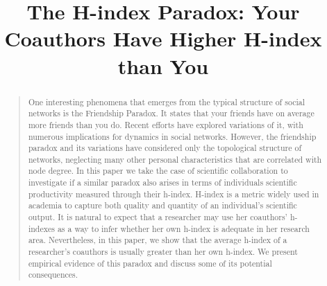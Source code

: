 \documentclass[letterpaper]{article}
\begin{document}
%
\title{The H-index Paradox: Your Coauthors Have Higher H-index than You}



\maketitle
\begin{abstract}
\begin{quote}

One interesting phenomena that emerges from the typical structure of social networks is the Friendship Paradox. It states that your friends have on average more friends than you do. Recent efforts have explored variations of it, with numerous implications for dynamics in social networks.
However, the friendship paradox and its variations have considered only the topological structure of networks, neglecting many other personal characteristics that are correlated with node degree. In this paper we take the case of scientific collaboration to investigate if a similar paradox also arises in terms of individuals scientific productivity measured through their h-index. H-index is a metric widely used in academia to capture both quality and quantity of an individual's scientific output. It is natural to expect that a researcher may use her coauthors' h-indexes as a way to infer whether her own h-index is adequate in her research area. Nevertheless, in this paper, we show that the average h-index of a researcher's coauthors is usually greater than her own h-index. We present empirical evidence of this paradox and discuss some of its potential consequences.
\end{quote}
\end{abstract}
\end{document}
